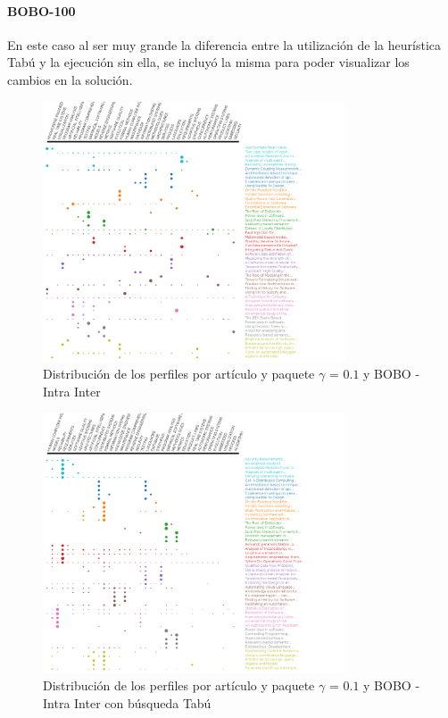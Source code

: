 \paragraph{BOBO-100}
En este caso al ser muy grande la diferencia entre la utilización de la heurística Tabú y la ejecución sin ella,  se incluyó la misma para poder visualizar los cambios en la solución.
\begin{figure}[H]
  \centering
    \includegraphics[width=0.8\textwidth]{resultados/papers/BOBO/INTRA_INTER/gamma-01.png}
  \caption{Distribución de los perfiles por artículo y paquete $\gamma$ = $0.1$ y BOBO - Intra Inter}
  \label{res:img-papers-gamma01-bobo-intra-inter}
\end{figure}

\begin{figure}[H]
  \centering
    \includegraphics[width=0.8\textwidth]{resultados/papers/BOBO/INTRA_INTER/gamma-with-local-01.png}
  \caption{Distribución de los perfiles por artículo y paquete $\gamma$ = $0.1$ y BOBO - Intra Inter con búsqueda Tabú}
  \label{res:img-papers-gamma01-bobo-intra-inter-tabu}
\end{figure}

